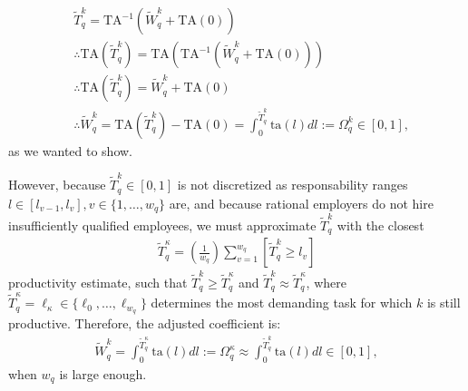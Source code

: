 \documentclass[hidelinks, nonatbib]{elsarticle}
\begin{document}
    \begin{align}
        &\tilde{T}_{q}^{k}
        =
        \text{TA}^{-1}
        \left(
            \tilde{W}_{q}^{k}
            +
            \text{TA}(0)
        \right)
        \\
        &
        \therefore
        \text{TA}
        (
            \tilde{T}_{q}^{k}
        )
        =
        \text{TA}
        \left(
            \text{TA}^{-1}
            \left(
                \tilde{W}_{q}^{k}
                +
                \text{TA}(0)
            \right)
        \right)
        \\
        &
        \therefore
        \text{TA}
        (
            \tilde{T}_{q}^{k}
        )
        =
        \tilde{W}_{q}^{k}
        +
        \text{TA}(0)
        \\
        &
        \therefore
        \tilde{W}_{q}^{k}
        =
        \text{TA}
        (
            \tilde{T}_{q}^{k}
        )
        -
        \text{TA}(0)
        =
        \int_{0}^{\tilde{T}_{q}^{k}}
        \text{ta}(l)
        dl
        :=
        \Omega_{q}^{k}
        \in 
        [0,1]
        ,
    \end{align}
    as we wanted to show.
    
    However, because $\tilde{T}_{q}^{k} \in [0,1]$ is not discretized as responsability ranges $l \in [l_{v-1},l_{v}], v \in \{1, \dots, w_q\}$ are, and because rational employers do not hire insufficiently qualified employees, we must approximate $\tilde{T}_{q}^{k}$ with the closest 
    \begin{gather}
        \tilde{T}_{q}^{\kappa}
        =
        \left(
            \frac{1}{w_q}
        \right)
        \sum_{v=1}^{w_q}
        \left[
            \tilde{T}_{q}^{k}
            \geq
            l_v
        \right]
    \end{gather}
    productivity estimate, such that $\tilde{T}_{q}^{k} \geq \tilde{T}_{q}^{\kappa}$ and $\tilde{T}_{q}^{k} \approx \tilde{T}_{q}^{\kappa}$, where $
    \tilde{T}_{q}^{\kappa} = \ell_{\kappa} \in \{\ell_0, \dots, \ell_{w_q}\}$ determines the most demanding task for which $k$ is still productive. Therefore, the adjusted coefficient is:
    \begin{gather}
        \tilde{W}_{q}^{k}
        =
        \int_{0}^{\tilde{T}_{q}^{\kappa}}
        \text{ta}(l)
        dl
        :=
        \Omega_{q}^{\kappa}
        \approx
        \int_{0}^{\tilde{T}_{q}^{k}}
        \text{ta}(l)
        dl
        \in 
        [0,1]
        ,
    \end{gather}
    when $w_q$ is large enough.
\end{document}
